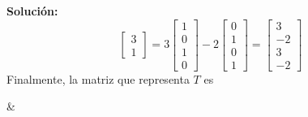 \documentclass[12pt]{article}
\newenvironment{solucion}
{\begin{mdframed}[backgroundcolor=black!10]
		{\bf Solución:}\\
	}
	{
	\end{mdframed}
}
\newenvironment{preguntas}
{\begin{enumerate}\itemsep12pt
	}
	{
	\end{enumerate}
}
\begin{document}
\begin{preguntas}
\begin{solucion}
$$\begin{bmatrix}
		3 \\ 1
		\end{bmatrix} = 3 \begin{bmatrix}1 \\ 0 \\ 1 \\ 0\end{bmatrix} - 2 \begin{bmatrix}0 \\ 1 \\ 0 \\ 1\end{bmatrix} = \begin{bmatrix}3 \\ -2 \\ 3 \\ -2\end{bmatrix}$$
		Finalmente, la matriz que representa $T$ es
		$$\begin{bmatrix}
		T\begin{bmatrix}
		1 \\ 0
		\end{bmatrix}
		&
		

\end{solucion}
\end{preguntas}
\end{document}
